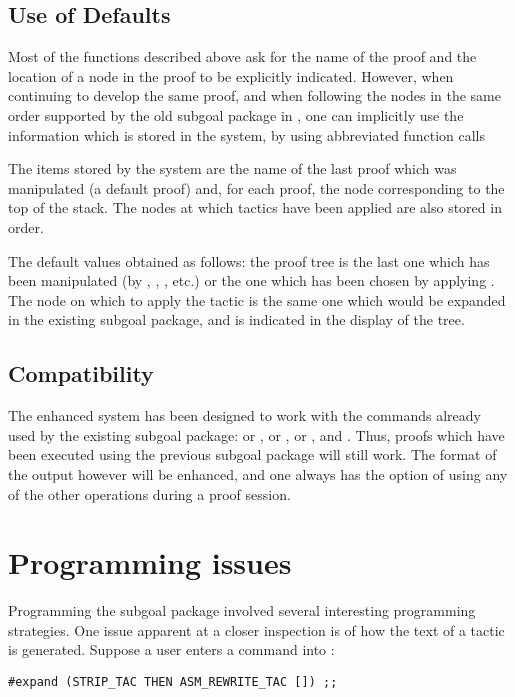 \subsection{ Use of Defaults}

Most of the functions described above ask for the name of the proof
and the location of a node in the proof to be explicitly indicated.
However, when continuing to develop the same proof, and when following
the nodes in the same order supported by the old subgoal package in
\HOL, one can implicitly use the information which is stored in the
system, by using abbreviated function calls

The items stored by the system are the name of the last proof which
was manipulated (a default proof) and, for each proof, the node
corresponding to the top of the stack. The nodes at which tactics have
been applied are also stored in order.

The default values obtained as follows: the proof tree is the last one
which has been manipulated (by , ,
, etc.) or the one which has been chosen by applying
.  The node on which to apply the tactic is the
same one which would be expanded in the existing subgoal package, and
is indicated in the display of the tree.


\subsection{ Compatibility}

The enhanced system has been designed to work with the commands
already used by the existing subgoal package:  or
,  or ,  or , and
. Thus, proofs which have been executed using the
previous subgoal package will still work.  The format of the output
however will be enhanced, and one always has the option of using any
of the other operations during a proof session.

\section{ Programming issues}

Programming the subgoal package involved several interesting
programming strategies. One issue apparent at a closer inspection is
of how the text of a tactic is generated. Suppose a user enters a
command into \HOL:

\begin{verbatim}
#expand (STRIP_TAC THEN ASM_REWRITE_TAC []) ;;
\end{verbatim}

